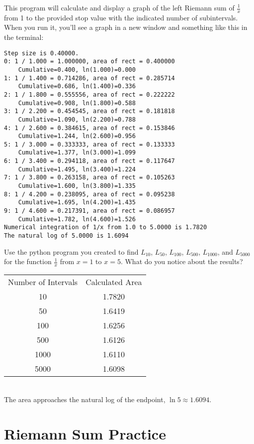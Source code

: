 This program will calculate and display a graph of the left Riemann sum of $\frac{1}{x}$ from 1 to the provided stop value with the indicated number of subintervals. When you run it, you'll see a graph in a new window and something like this in the terminal:
\begin{Verbatim}
Step size is 0.40000.
0: 1 / 1.000 = 1.000000, area of rect = 0.400000 
	Cumulative=0.400, ln(1.000)=0.000
1: 1 / 1.400 = 0.714286, area of rect = 0.285714 
	Cumulative=0.686, ln(1.400)=0.336
2: 1 / 1.800 = 0.555556, area of rect = 0.222222 
	Cumulative=0.908, ln(1.800)=0.588
3: 1 / 2.200 = 0.454545, area of rect = 0.181818 
	Cumulative=1.090, ln(2.200)=0.788
4: 1 / 2.600 = 0.384615, area of rect = 0.153846 
	Cumulative=1.244, ln(2.600)=0.956
5: 1 / 3.000 = 0.333333, area of rect = 0.133333 
	Cumulative=1.377, ln(3.000)=1.099
6: 1 / 3.400 = 0.294118, area of rect = 0.117647 
	Cumulative=1.495, ln(3.400)=1.224
7: 1 / 3.800 = 0.263158, area of rect = 0.105263 
	Cumulative=1.600, ln(3.800)=1.335
8: 1 / 4.200 = 0.238095, area of rect = 0.095238 
	Cumulative=1.695, ln(4.200)=1.435
9: 1 / 4.600 = 0.217391, area of rect = 0.086957 
	Cumulative=1.782, ln(4.600)=1.526
Numerical integration of 1/x from 1.0 to 5.0000 is 1.7820
The natural log of 5.0000 is 1.6094
\end{Verbatim}

\begin{Exercise}[label=rsumpython]
Use the python program you created to find $L_{10}$, $L_{50}$, $L_{100}$, $L_{500}$, $L_{1000}$, and $L_{5000}$ for the function $\frac{1}{x}$ from $x=1$ to $x=5$. What do you notice about the results?
\end{Exercise}

\begin{Answer}[ref=rsumpython]
	\begin{tabular}{c|c}
	Number of Intervals & Calculated Area\\
	10 & 1.7820 \\
	50 & 1.6419 \\
	100 & 1.6256 \\
	500 & 1.6126 \\
	1000 & 1.6110 \\
	5000 & 1.6098 \\
	\end{tabular}
	\\The area approaches the natural log of the endpoint, $\ln{5} \approx 1.6094$. 
\end{Answer}

\section{Riemann Sum Practice}

